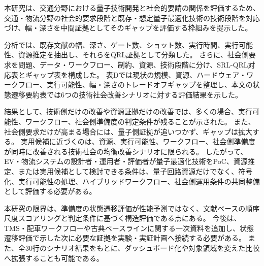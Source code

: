 本研究は、交通分野における量子技術開発と社会的要請の関係を評価するため、交通・物流分野の社会的要求段階と既存・想定量子最適化技術の技術段階を対応づけ、幅・深さを中間証拠としてそのギャップを評価する枠組みを提示した。

分析では、既存文献の幅、深さ、ゲート数、ショット数、実行時間、実行可能性、資源推定を抽出し、それらをQRL証拠として分類した。
さらに、社会側要求を問題、データ・ワークフロー、制約、資源、技術段階に分け、SRL-QRL対応表とギャップ表を構成した。
表Dでは現状の規模、資源、ハードウェア・ワークフロー、実行可能性、幅・深さのトレードオフギャップを整理し、本文の状態遷移要約表では6つの技術社会改善シナリオに対する評価結果を示した。

結果として、技術側だけの改善や資源証拠だけの改善では、多くの場合、実行可能性、ワークフロー、社会側準備度の判定条件が残ることが示された。
また、社会側要求だけが高まる場合には、量子側証拠が追いつかず、ギャップは拡大する。
実用候補に近づくのは、資源、実行可能性、ワークフロー、社会側準備度が同時に改善される技術社会の均衡改善シナリオに限られる。
したがって、EV・物流システムの設計者・運用者・評価者が量子最適化技術をPoC、資源推定、または実用候補として検討できる条件は、量子回路資源だけでなく、符号化、実行可能性の処理、ハイブリッドワークフロー、社会側運用条件の共同整備として評価する必要がある。

本研究の限界は、準備度の状態遷移評価が性能予測ではなく、文献ベースの順序尺度スコアリングと判定条件に基づく構造評価である点にある。
今後は、TMS・配車ワークフローや古典ベースラインに関する一次資料を追加し、状態遷移評価で示した次に必要な証拠を実験・実証計画へ接続する必要がある。
また、全30行のシナリオ結果をもとに、ダッシュボード化や対象領域を変えた比較へ拡張することも可能である。
